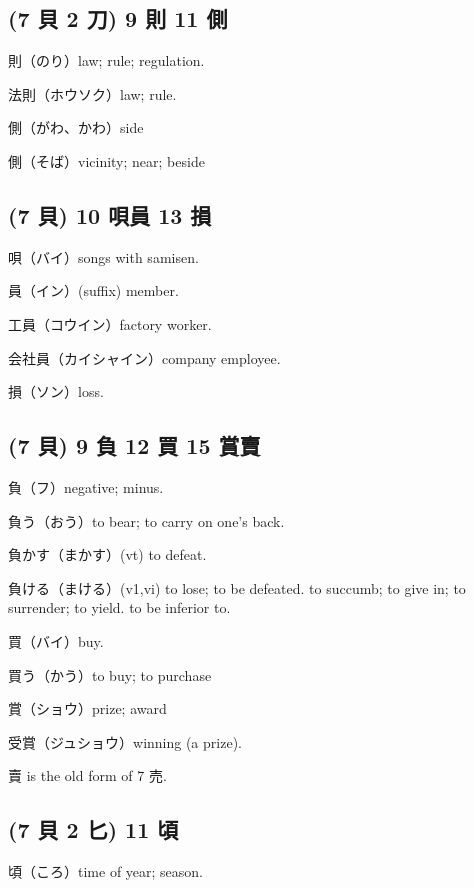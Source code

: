 \subsection{(7 貝 2 刀) 9 則 11 側}

則（のり）law; rule; regulation.

法則（ホウソク）law; rule.

側（がわ、かわ）side

側（そば）vicinity; near; beside

\subsection{(7 貝) 10 唄員 13 損}

唄（バイ）songs with samisen.

員（イン）(suffix) member.

工員（コウイン）factory worker.

会社員（カイシャイン）company employee.

損（ソン）loss.

\subsection{(7 貝) 9 負 12 買 15 賞賣}

負（フ）negative; minus.

負う（おう）to bear; to carry on one's back.

負かす（まかす）(vt) to defeat.

負ける（まける）(v1,vi)
to lose; to be defeated.
to succumb; to give in; to surrender; to yield.
to be inferior to.

買（バイ）buy.

買う（かう）to buy; to purchase

賞（ショウ）prize; award

受賞（ジュショウ）winning (a prize).

賣 is the old form of 7 売.

\subsection{(7 貝 2 匕) 11 頃}

頃（ころ）time of year; season.


